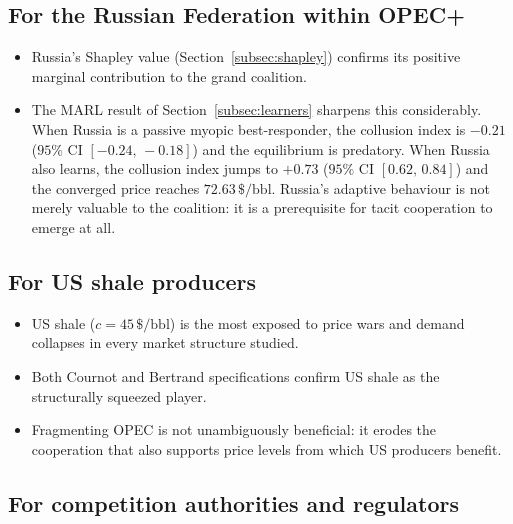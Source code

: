 \subsection*{For the Russian Federation within OPEC+}

\begin{itemize}\itemsep2pt

  \item Russia's Shapley value (Section~\ref{subsec:shapley}) confirms its
        positive marginal contribution to the grand coalition.

  \item The MARL result of Section~\ref{subsec:learners}
        sharpens this considerably. When Russia is a passive
        myopic best-responder, the collusion index is $-0.21$
        ($95\%$ CI $[-0.24,\,-0.18]$) and the equilibrium is
        predatory. When Russia also learns, the collusion index
        jumps to $+0.73$ ($95\%$ CI $[0.62,\,0.84]$) and the
        converged price reaches $72.63\,\$\text{/bbl}$.
        Russia's adaptive behaviour is not merely valuable to
        the coalition: it is a prerequisite for tacit
        cooperation to emerge at all.

\end{itemize}

\subsection*{For US shale producers}

\begin{itemize}\itemsep2pt

  \item US shale ($c = 45\,\$\text{/bbl}$) is the most exposed
        to price wars and demand collapses in every market
        structure studied.

  \item Both Cournot and Bertrand specifications confirm US
        shale as the structurally squeezed player.

  \item Fragmenting OPEC is not unambiguously beneficial:
        it erodes the cooperation that also supports price
        levels from which US producers benefit.

\end{itemize}

\subsection*{For competition authorities and regulators}

